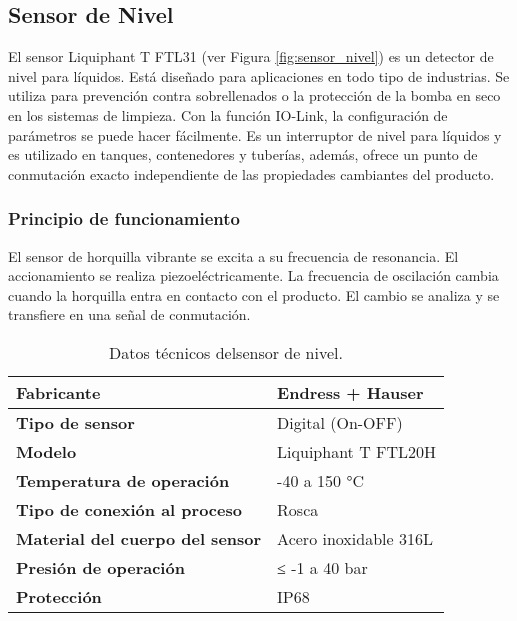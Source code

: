 \subsection{Sensor de Nivel}

El sensor Liquiphant T FTL31 (ver Figura \ref{fig:sensor_nivel}) es un detector de nivel para
líquidos. Está diseñado para aplicaciones en todo tipo de industrias. Se utiliza
para prevención contra sobrellenados o la protección de la bomba en seco en
los sistemas de limpieza. Con la función IO-Link, la configuración de parámetros
se puede hacer fácilmente. Es un interruptor de nivel para líquidos y es utilizado
en tanques, contenedores y tuberías, además, ofrece un punto de conmutación
exacto independiente de las propiedades cambiantes del producto.\\

\subsubsection*{Principio de funcionamiento}

El sensor de horquilla vibrante se excita a su frecuencia de resonancia. El
accionamiento se realiza piezoeléctricamente. La frecuencia de oscilación
cambia cuando la horquilla entra en contacto con el producto. El cambio se
analiza y se transfiere en una señal de conmutación.\\


\renewcommand{\arraystretch}{2}
\begin{table}[H]
    \centering
    \caption{Datos técnicos delsensor de nivel.}
    \label{table:sensor_nivel}
    \begin{tabular}{| L{5cm} | L{5cm} |}
        \hline
        \textbf{Fabricante} & Endress + Hauser  \\
        \hline
        \textbf{Tipo de sensor} & Digital (On-OFF)  \\
        \hline
        \textbf{Modelo} & Liquiphant T FTL20H  \\
        \hline
        \textbf{Temperatura de operación} & -40 a 150 °C  \\
        \hline
        \textbf{Tipo de conexión al proceso} & Rosca  \\
        \hline
        \textbf{Material del cuerpo del sensor} & Acero inoxidable 316L  \\
        \hline
        \textbf{Presión de operación} & ≤ -1 a 40 bar  \\
        \hline
        \textbf{Protección} & IP68  \\
        \hline
   
    \end{tabular}
\end{table}
